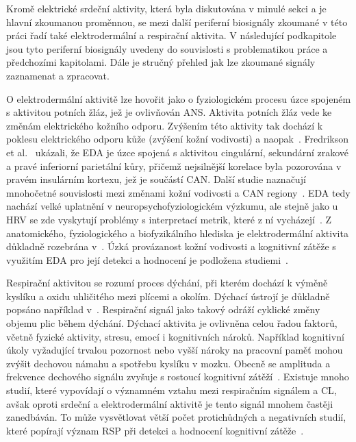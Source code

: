 Kromě elektrické srdeční aktivity, která byla diskutována v minulé sekci a je
hlavní zkoumanou proměnnou, se mezi další periferní biosignály zkoumané v této
práci řadí také elektrodermální a respirační aktivita. V následující podkapitole
jsou tyto periferní biosignály uvedeny do souvislosti s problematikou práce a
předchozími kapitolami. Dále je stručný přehled jak lze zkoumané signály
zaznamenat a zpracovat.

O elektrodermální aktivitě lze hovořit jako o fyziologickém procesu úzce
spojeném s aktivitou potních žláz, jež je ovlivňován \gls{ANS}. Aktivita potních
žláz vede ke změnám elektrického kožního odporu. Zvýšením této aktivity tak
dochází k poklesu elektrického odporu kůže (zvýšení kožní vodivosti) a
naopak~\cite{Boucsein2012,Critchley2002,Tronstad2022}. Fredrikson et
al.~\cite{Fredrikson1998} ukázali, že EDA je úzce spojená s aktivitou
cingulární, sekundární zrakové a pravé inferiorní parietální kůry, přičemž
nejsilnější korelace byla pozorována v pravém insulárním kortexu, jež je
součástí \gls{CAN}. Další studie naznačují mnohočetné souvislosti mezi změnami
kožní vodivosti a \gls{CAN}
regiony~\cite{Critchley2002,Buchwald2019,Caruelle2019,Sanchez2020}. EDA tedy
nachází velké uplatnění v neuropsychofyziologickém výzkumu, ale stejně jako u
HRV se zde vyskytují problémy s interpretací metrik, které z ní
vycházejí~\cite{Blechert2016}. Z anatomického, fyziologického a biofyzikálního
hlediska je elektrodermální aktivita důkladně rozebrána v~\cite{Boucsein2012}.
Úzká provázanost kožní vodivosti a kognitivní zátěže s využitím EDA pro její
detekci a hodnocení je podložena
studiemi~\cite{Bahauddin2021,Ghaderyan2018,Hossain2019,
Nourbakhsh2012,Paas2003,Posada2018,Shi2007,Shimomura2008}.

Respirační aktivitou se rozumí proces dýchání, při kterém dochází k výměně
kyslíku a oxidu uhličitého mezi plícemi a okolím. Dýchací ústrojí je důkladně
popsáno například v~\cite{Kara2010}. Respirační signál jako takový odráží
cyklické změny objemu plic během dýchání. Dýchací aktivita je ovlivněna celou
řadou faktorů, včetně fyzické aktivity, stresu, emocí i kognitivních nároků.
Například kognitivní úkoly vyžadující trvalou pozornost nebo vyšší nároky na
pracovní paměť mohou zvýšit dechovou námahu a spotřebu kyslíku v mozku. Obecně
se amplituda a frekvence dechového signálu zvyšuje s rostoucí kognitivní
zátěží~\cite{Ayres2021}. Existuje mnoho studií, které vypovídají o významném
vztahu mezi respiračním signálem a \gls{CL}, avšak oproti srdeční a
elektrodermální aktivitě je tento signál mnohem častěji zanedbáván. To může
vysvětlovat větší počet protichůdných a negativních studií, které popírají
význam RSP při detekci a hodnocení kognitivní
zátěže~\cite{Ayres2021,Grassmann2016}.

